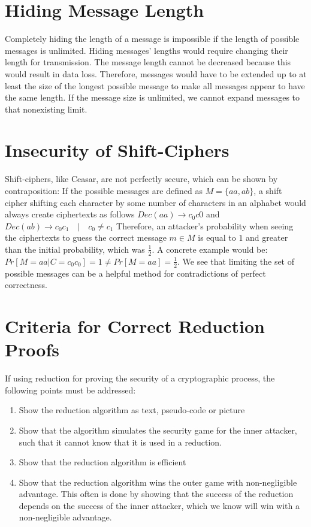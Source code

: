\section{Hiding Message Length}

Completely hiding the length of a message is impossible if the length of possible messages is unlimited. Hiding messages' lengths would require changing their length for transmission. The message length cannot be decreased because this would result in data loss. Therefore, messages would have to be extended up to at least the size of the longest possible message to make all messages appear to have the same length. If the message size is unlimited, we cannot expand messages to that nonexisting limit.

\section{Insecurity of Shift-Ciphers}

Shift-ciphers, like Ceasar, are not perfectly secure, which can be shown by contraposition: If the possible messages are defined as $M=\{aa, ab\}$, a shift cipher shifting each character by some number of characters in an alphabet would always create ciphertexts as follows $Dec(aa) \rightarrow c_{0}c{0}$ and $Dec(ab) \rightarrow c_{0}c_{1} \quad|\quad c_{0} \neq c_{1}$ Therefore, an attacker's probability when seeing the ciphertexts to guess the correct message $m \in M$ is equal to $1$ and greater than the initial probability, which was $\frac{1}{2}$. A concrete example would be: $Pr[M=aa | C=c_{0}c_{0}] = 1 \neq Pr[M=aa] = \frac{1}{2}$. We see that limiting the set of possible messages can be a helpful method for contradictions of perfect correctness.

\section{Criteria for Correct Reduction Proofs}

If using reduction for proving the security of a cryptographic process, the following points must be addressed:

\begin{enumerate}
    \item Show the reduction algorithm as text, pseudo-code or picture
    \item Show that the algorithm simulates the security game for the inner attacker, such that it cannot know that it is used in a reduction.
    \item Show that the reduction algorithm is efficient
    \item Show that the reduction algorithm wins the outer game with non-negligible advantage. This often is done by showing that the success of the reduction depends on the success of the inner attacker, which we know will win with a non-negligible advantage.
\end{enumerate}
